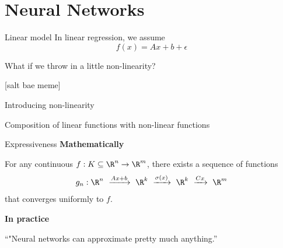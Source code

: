 \section{Neural Networks}

\begin{frame}{Linear model}
	In linear regression, we assume
	\begin{equation}
		f(x) = Ax + b + \epsilon
	\end{equation}

	What if we throw in a little non-linearity?

	[salt bae meme]

\end{frame}

\begin{frame}{Introducing non-linearity}

	Composition of linear functions with non-linear functions
\end{frame}

\begin{frame}{Expressiveness}
	\textbf{Mathematically}

	For any continuous $f : K \subseteq \R^n \to \R^m$, there exists a sequence of functions
	\begin{equation*}
		g_n :
		\R^n
		\ \xrightarrow{Ax + b} \ \R^k
		\ \xrightarrow{\sigma(x)} \  \R^k
		\ \xrightarrow{Cx} \ \R^m
	\end{equation*}
	that converges uniformly to $f$.

	\pause \bigskip

	\textbf{In practice}

	``"Neural networks can approximate pretty much anything.''

\end{frame}

